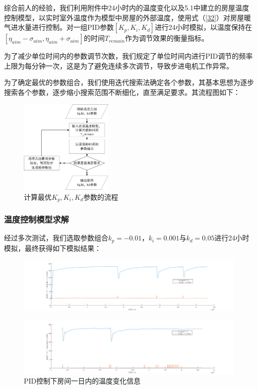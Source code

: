 \documentclass{my_paper}
\begin{document}
综合前人的经验，我们利用附件中24小时内的温度变化以及5.1中建立的房屋温度控制模型，以实时室外温度作为模型中房屋的外部温度，使用式（\ref{32}）对房屋暖气进水量进行控制。对一组PID参数$[K_p,K_i,K_d]$进行24小时模拟，以温度保持在$ [\eta_{aim}-\sigma_{aim},\eta_{aim}+\sigma_{aim}] $的时间$T_{remain}$作为调节效果的衡量指标。

为了减少单位时间内的参数调节次数，我们规定了单位时间内进行PID调节的频率上限为每分钟一次，这是为了避免连续多次调节，导致步进电机工作异常。

为了确定最优的参数组合，我们使用迭代搜索法确定各个参数，其基本思想为逐步搜索各个参数，逐步缩小搜索范围不断细化，直至满足要求。其流程图如下：

\begin {figure}[h]
\centering %
\includegraphics[width=0.4\textwidth]{liuc.jpg}
\caption{计算最优$K_p,K_i,K_d$参数的流程} %
\label{five}
\end {figure}

\newpage
\subsubsection{温度控制模型求解}

经过多次测试，我们选取参数组合$k_p = -0.01$，$k_i= 0.001$与$k_d = 0.05$进行24小时模拟，最终获得如下模拟结果：



\begin {figure}[h]
\centering %
\includegraphics[width=\textwidth]{wd1.png}
\label{five}
\end {figure}
\begin {figure}[h]
\centering %
\includegraphics[width=\textwidth]{wd2.png}
\caption{PID控制下房间一日内的温度变化信息} %
\label{five}
\end {figure}
\end{document}
